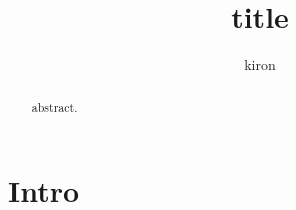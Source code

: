 \documentclass{report}
\title{title}
\author{kiron}
\begin{document}
\maketitle

\begin{abstract}
	abstract.
\end{abstract}

\section{Intro}
\layout
\blindtext[8]
\end{document}
